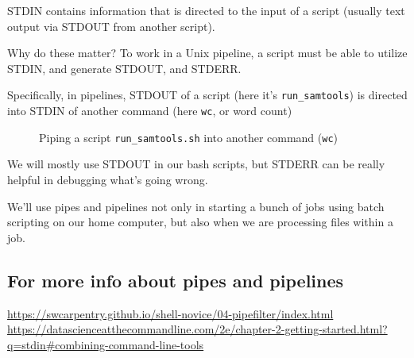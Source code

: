 \documentclass[
  letterpaper,
  DIV=11,
  numbers=noendperiod]{scrreprt}
\begin{document}
STDIN contains information that is directed to the input of a script
(usually text output via STDOUT from another script).

Why do these matter? To work in a Unix pipeline, a script must be able
to utilize STDIN, and generate STDOUT, and STDERR.

Specifically, in pipelines, STDOUT of a script (here it's
\texttt{run\_samtools}) is directed into STDIN of another command (here
\texttt{wc}, or word count)

\begin{figure}


\caption{\label{fig-pipe}Piping a script \texttt{run\_samtools.sh} into
another command (\texttt{wc})}

\end{figure}%

We will mostly use STDOUT in our bash scripts, but STDERR can be really
helpful in debugging what's going wrong.

\begin{tcolorbox}[enhanced jigsaw, colbacktitle=quarto-callout-note-color!10!white, left=2mm, toprule=.15mm, toptitle=1mm, opacityback=0, bottomrule=.15mm, breakable, leftrule=.75mm, colframe=quarto-callout-note-color-frame, bottomtitle=1mm, titlerule=0mm, coltitle=black, title=\textcolor{quarto-callout-note-color}{\faInfo}\hspace{0.5em}{Why this is important on the Cluster}, rightrule=.15mm, arc=.35mm, opacitybacktitle=0.6, colback=white]

We'll use pipes and pipelines not only in starting a bunch of jobs using
batch scripting on our home computer, but also when we are processing
files within a job.

\end{tcolorbox}

\subsection{For more info about pipes and
pipelines}\label{for-more-info-about-pipes-and-pipelines}

\url{https://swcarpentry.github.io/shell-novice/04-pipefilter/index.html}
\url{https://datascienceatthecommandline.com/2e/chapter-2-getting-started.html?q=stdin\#combining-command-line-tools}
\end{document}
